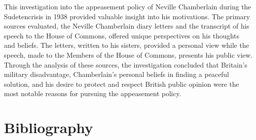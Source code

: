 \documentclass[10pt, a4papert, hidelinks]{article}
\begin{document}
This investigation into the appeasement policy of Neville Chamberlain during the Sudetencrisis in 1938 provided valuable insight into his motivations. The primary sources evaluated, the Neville Chamberlain diary letters and the transcript of his speech to the House of Commons, offered unique perspectives on his thoughts and beliefs. The letters, written to his sisters, provided a personal view while the speech, made to the Members of the House of Commons, presents his public view. Through the analysis of these sources, the investigation concluded that Britain's military disadvantage, Chamberlain's personal beliefs in finding a peaceful solution, and his desire to protect and respect British public opinion were the most notable reasons for pursuing the appeasement policy.

\newpage
\section{Bibliography}
\printbibliography[heading=none]
\end{document}
